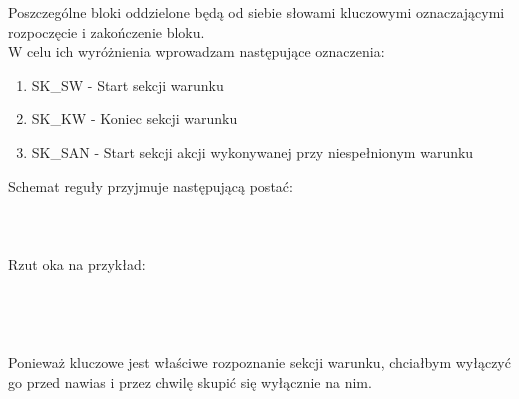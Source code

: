 Poszczególne bloki oddzielone będą od siebie słowami kluczowymi oznaczającymi rozpoczęcie i zakończenie bloku. \\

W celu ich wyróżnienia wprowadzam następujące oznaczenia:
\begin{enumerate}
	\item SK\_SW - Start sekcji warunku
	\item SK\_KW - Koniec sekcji warunku
	\item SK\_SAN - Start sekcji akcji wykonywanej przy niespełnionym warunku
\end{enumerate}
Schemat reguły przyjmuje następującą postać:
\\ \\
\\ \\

Rzut oka na przykład:
\\ \\
\\ \\

\paragraph{}
Ponieważ kluczowe jest właściwe rozpoznanie sekcji warunku, chciałbym wyłączyć go przed nawias i przez chwilę skupić się wyłącznie na nim. 
\\ \\
\\ \\


